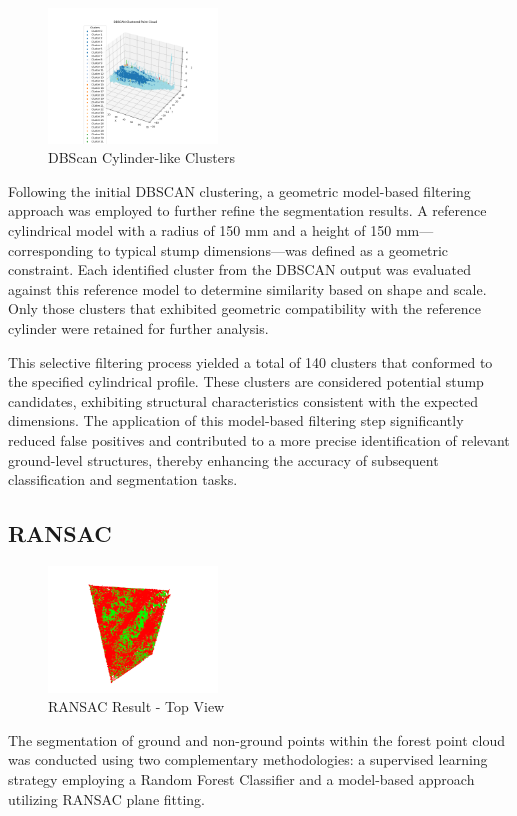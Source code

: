 \documentclass[../report.tex]{subfiles}
\begin{document}
    \begin{figure}[H]
        \centering
        \includegraphics[width=0.4\textwidth]{rnd-project-report-main/figures/Clustering_2_filtered_point_cloud_with labels.png}
        \caption{DBScan Cylinder-like Clusters}
    \end{figure}
    Following the initial DBSCAN clustering, a geometric model-based filtering approach was employed to further refine the segmentation results. A reference cylindrical model with a radius of 150 mm and a height of 150 mm—corresponding to typical stump dimensions—was defined as a geometric constraint. Each identified cluster from the DBSCAN output was evaluated against this reference model to determine similarity based on shape and scale. Only those clusters that exhibited geometric compatibility with the reference cylinder were retained for further analysis.

    This selective filtering process yielded a total of 140 clusters that conformed to the specified cylindrical profile. These clusters are considered potential stump candidates, exhibiting structural characteristics consistent with the expected dimensions. The application of this model-based filtering step significantly reduced false positives and contributed to a more precise identification of relevant ground-level structures, thereby enhancing the accuracy of subsequent classification and segmentation tasks.

    \subsection{RANSAC}
    \begin{figure}[H]
        \centering
        \includegraphics[width=0.4\textwidth]{rnd-project-report-main/figures/RANSAC.png}
        \caption{RANSAC Result - Top View}
    \end{figure}
    The segmentation of ground and non-ground points within the forest point cloud was conducted using two complementary methodologies: a supervised learning strategy employing a Random Forest Classifier and a model-based approach utilizing RANSAC plane fitting.
    
\end{document}
